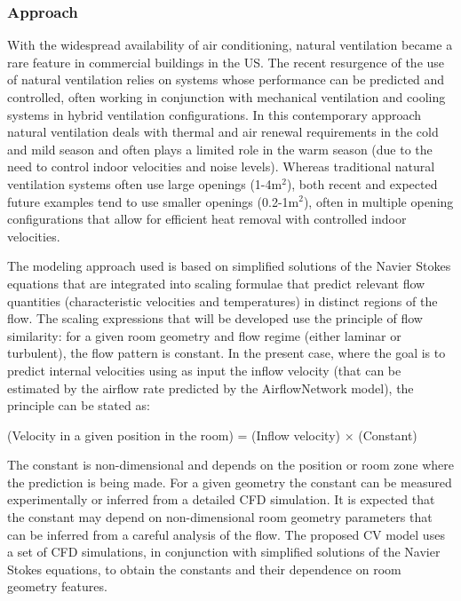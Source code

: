 \subsubsection{Approach}\label{approach}

With the widespread availability of air conditioning, natural ventilation became a rare feature in commercial buildings in the US. The recent resurgence of the use of natural ventilation relies on systems whose performance can be predicted and controlled, often working in conjunction with mechanical ventilation and cooling systems in hybrid ventilation configurations. In this contemporary approach natural ventilation deals with thermal and air renewal requirements in the cold and mild season and often plays a limited role in the warm season (due to the need to control indoor velocities and noise levels). Whereas traditional natural ventilation systems often use large openings (1-4m\(^{2}\)), both recent and expected future examples tend to use smaller openings (0.2-1m\(^{2}\)), often in multiple opening configurations that allow for efficient heat removal with controlled indoor velocities.

The modeling approach used is based on simplified solutions of the Navier Stokes equations that are integrated into scaling formulae that predict relevant flow quantities (characteristic velocities and temperatures) in distinct regions of the flow. The scaling expressions that will be developed use the principle of flow similarity: for a given room geometry and flow regime (either laminar or turbulent), the flow pattern is constant. In the present case, where the goal is to predict internal velocities using as input the inflow velocity (that can be estimated by the airflow rate predicted by the AirflowNetwork model), the principle can be stated as:

(Velocity in a given position in the room) = (Inflow velocity) × (Constant)

The constant is non-dimensional and depends on the position or room zone where the prediction is being made. For a given geometry the constant can be measured experimentally or inferred from a detailed CFD simulation. It is expected that the constant may depend on non-dimensional room geometry parameters that can be inferred from a careful analysis of the flow. The proposed CV model uses a set of CFD simulations, in conjunction with simplified solutions of the Navier Stokes equations, to obtain the constants and their dependence on room geometry features.

